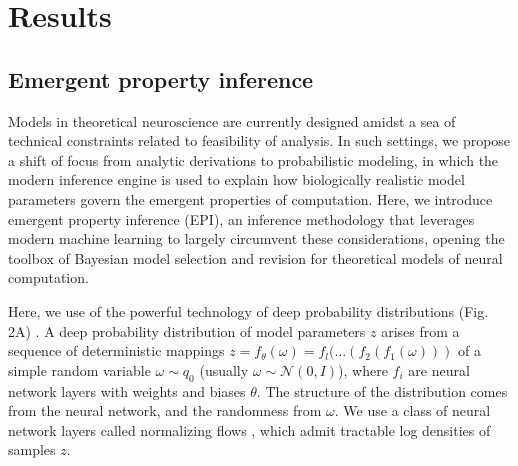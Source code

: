 \documentclass[11pt]{article}
\begin{document}


\section{Results}
\subsection{Emergent property inference}
Models in theoretical neuroscience are currently designed amidst a sea of technical constraints related to feasibility of analysis.
In such settings, we propose a shift of focus from analytic derivations to probabilistic modeling, in which the modern inference engine is used to explain how biologically realistic model parameters govern the emergent properties of computation.
Here, we introduce emergent property inference (EPI), an inference methodology that  leverages modern machine learning to largely circumvent these considerations, opening the toolbox of Bayesian model selection and revision for theoretical models of neural computation.  

Here, we use of the powerful technology of deep probability distributions (Fig. 2A) \cite{best_image_DGM, wavenet}.
A deep probability distribution of model parameters $z$ arises from a sequence of deterministic mappings $z = f_\theta(\omega) = f_l(...(f_2(f_1(\omega)))$ of a simple random variable $\omega \sim q_0$ (usually $\omega \sim \mathcal{N}(0, I)$), where $f_i$ are neural network layers  with weights and biases $\theta$.
The structure of the distribution comes from the neural network, and the randomness from $\omega$.
We use a class of neural network layers called normalizing flows \cite{rezende2015variational}, which admit tractable log densities of samples $z$.
\end{document}
